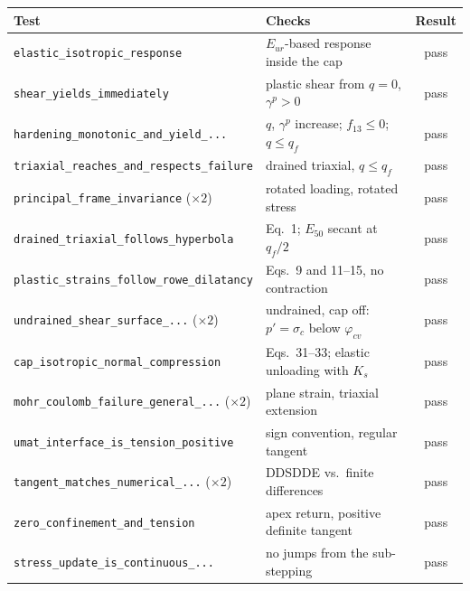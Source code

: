 \documentclass[11pt,a4paper]{article}
\begin{document}
\begin{table}[h]
  \centering
  \small
  \begin{tabular}{llc}
    \toprule
    Test & Checks & Result \\
    \midrule
    \texttt{elastic\_isotropic\_response}                & $E_{ur}$-based response inside the cap      & pass \\
    \texttt{shear\_yields\_immediately}                  & plastic shear from $q = 0$, $\gamma^p > 0$ & pass \\
    \texttt{hardening\_monotonic\_and\_yield\_...}       & $q$, $\gamma^p$ increase; $f_{13} \le 0$; $q \le q_f$ & pass \\
    \texttt{triaxial\_reaches\_and\_respects\_failure}   & drained triaxial, $q \le q_f$              & pass \\
    \texttt{principal\_frame\_invariance} ($\times 2$)   & rotated loading, rotated stress            & pass \\
    \texttt{drained\_triaxial\_follows\_hyperbola}       & Eq.~1; $E_{50}$ secant at $q_f/2$          & pass \\
    \texttt{plastic\_strains\_follow\_rowe\_dilatancy}   & Eqs.~9 and 11--15, no contraction          & pass \\
    \texttt{undrained\_shear\_surface\_...} ($\times 2$) & undrained, cap off: $p' = \sigma_c$ below $\varphi_{cv}$ & pass \\
    \texttt{cap\_isotropic\_normal\_compression}         & Eqs.~31--33; elastic unloading with $K_s$  & pass \\
    \texttt{mohr\_coulomb\_failure\_general\_...} ($\times 2$) & plane strain, triaxial extension     & pass \\
    \texttt{umat\_interface\_is\_tension\_positive}      & sign convention, regular tangent           & pass \\
    \texttt{tangent\_matches\_numerical\_...} ($\times 2$) & DDSDDE vs.\ finite differences           & pass \\
    \texttt{zero\_confinement\_and\_tension}             & apex return, positive definite tangent     & pass \\
    \texttt{stress\_update\_is\_continuous\_...}         & no jumps from the sub-stepping             & pass \\
    \bottomrule
  \end{tabular}
\end{table}
\end{document}
